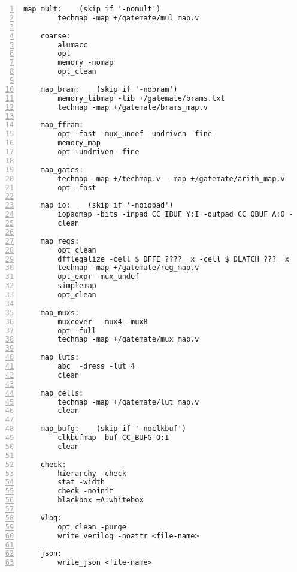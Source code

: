 \begin{lstlisting}[numbers=left,frame=single]
    map_mult:    (skip if '-nomult')
        techmap -map +/gatemate/mul_map.v

    coarse:
        alumacc
        opt
        memory -nomap
        opt_clean

    map_bram:    (skip if '-nobram')
        memory_libmap -lib +/gatemate/brams.txt
        techmap -map +/gatemate/brams_map.v

    map_ffram:
        opt -fast -mux_undef -undriven -fine
        memory_map
        opt -undriven -fine

    map_gates:
        techmap -map +/techmap.v  -map +/gatemate/arith_map.v
        opt -fast

    map_io:    (skip if '-noiopad')
        iopadmap -bits -inpad CC_IBUF Y:I -outpad CC_OBUF A:O -toutpad CC_TOBUF ~T:A:O -tinoutpad CC_IOBUF ~T:Y:A:IO
        clean

    map_regs:
        opt_clean
        dfflegalize -cell $_DFFE_????_ x -cell $_DLATCH_???_ x
        techmap -map +/gatemate/reg_map.v
        opt_expr -mux_undef
        simplemap
        opt_clean

    map_muxs:
        muxcover  -mux4 -mux8
        opt -full
        techmap -map +/gatemate/mux_map.v

    map_luts:
        abc  -dress -lut 4
        clean

    map_cells:
        techmap -map +/gatemate/lut_map.v
        clean

    map_bufg:    (skip if '-noclkbuf')
        clkbufmap -buf CC_BUFG O:I
        clean

    check:
        hierarchy -check
        stat -width
        check -noinit
        blackbox =A:whitebox

    vlog:
        opt_clean -purge
        write_verilog -noattr <file-name>

    json:
        write_json <file-name>
\end{lstlisting}

